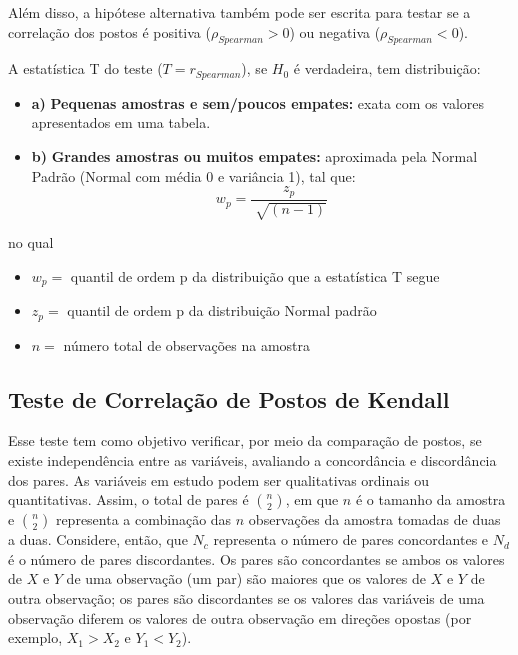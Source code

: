 \documentclass[
  portuguese,
]{estat/estat}
\providecommand{\tightlist}{%
  \setlength{\itemsep}{0pt}\setlength{\parskip}{0pt}}
\begin{document}
Além disso, a hipótese alternativa também pode ser escrita para testar
se a correlação dos postos é positiva (\(\rho_{Spearman} > 0\)) ou
negativa (\(\rho_{Spearman} < 0\)).

A estatística T do teste (\(T=r_{Spearman}\)), se \(H_0\) é verdadeira,
tem distribuição:

\begin{itemize}
\tightlist
\item
  \textbf{a)} \textbf{Pequenas amostras e sem/poucos empates:} exata com
  os valores apresentados em uma tabela.
\item
  \textbf{b)} \textbf{Grandes amostras ou muitos empates:} aproximada
  pela Normal Padrão (Normal com média 0 e variância 1), tal que: \[
  w_p = \frac{z_p}{\sqrt[]{(n-1)}}
  \]
\end{itemize}

no qual

\begin{itemize}
\tightlist
\item
  \(w_p=\) quantil de ordem p da distribuição que a estatística T segue
\item
  \(z_p=\) quantil de ordem p da distribuição Normal padrão
\item
  \(n=\) número total de observações na amostra
\end{itemize}

\subsection{Teste de Correlação de Postos de
Kendall}\label{teste-de-correlauxe7uxe3o-de-postos-de-kendall}

Esse teste tem como objetivo verificar, por meio da comparação de
postos, se existe independência entre as variáveis, avaliando a
concordância e discordância dos pares. As variáveis em estudo podem ser
qualitativas ordinais ou quantitativas. Assim, o total de pares é
\(\binom{n}{2}\), em que \(n\) é o tamanho da amostra e \(\binom{n}{2}\)
representa a combinação das \(n\) observações da amostra tomadas de duas
a duas. Considere, então, que \(N_{c}\) representa o número de pares
concordantes e \(N_{d}\) é o número de pares discordantes. Os pares são
concordantes se ambos os valores de \(X\) e \(Y\) de uma observação (um
par) são maiores que os valores de \(X\) e \(Y\) de outra observação; os
pares são discordantes se os valores das variáveis de uma observação
diferem os valores de outra observação em direções opostas (por exemplo,
\(X_{1} > X_{2}\) e \(Y_{1} < Y_{2}\)).
\end{document}
